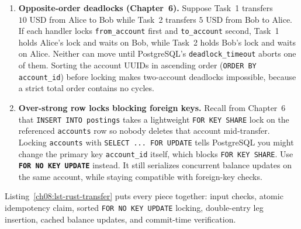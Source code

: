 \begin{enumerate}
  \item \textbf{Opposite-order deadlocks (Chapter~6).} Suppose Task~1 transfers
    $10\text{ USD}$ from Alice to Bob while Task~2 transfers $5\text{ USD}$ from
    Bob to Alice. If each handler locks \texttt{from\_account} first and
    \texttt{to\_account} second, Task~1 holds Alice's lock and waits on Bob, while
    Task~2 holds Bob's lock and waits on Alice. Neither can move until PostgreSQL's
    \texttt{deadlock\_timeout} aborts one of them. Sorting the account UUIDs in
    ascending order (\texttt{ORDER BY account\_id}) before locking makes two-account
    deadlocks impossible, because a strict total order contains no cycles.
  \item \textbf{Over-strong row locks blocking foreign keys.} Recall from Chapter~6
    that \texttt{INSERT INTO postings} takes a lightweight \texttt{FOR KEY SHARE}
    lock on the referenced \texttt{accounts} row so nobody deletes that account
    mid-transfer. Locking \texttt{accounts} with \texttt{SELECT ... FOR UPDATE}
    tells PostgreSQL you might change the primary key \texttt{account\_id} itself,
    which blocks \texttt{FOR KEY SHARE}. Use \textbf{\texttt{FOR NO KEY UPDATE}}
    instead. It still serializes concurrent balance updates on the same account,
    while staying compatible with foreign-key checks.
\end{enumerate}

Listing~\ref{ch08:lst-rust-transfer} puts every piece together: input checks,
atomic idempotency claim, sorted \texttt{FOR NO KEY UPDATE} locking, double-entry
leg insertion, cached balance updates, and commit-time verification.


